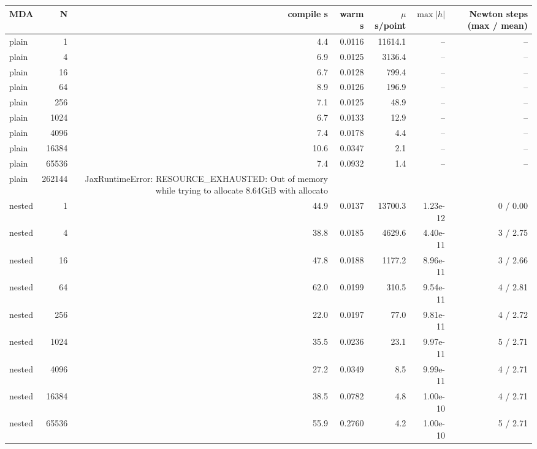 \begin{tabular}{lrrrrrr}
\toprule
MDA & N & compile s & warm s & $\mu$s/point & $\max|h|$ & Newton steps (max / mean) \\
\midrule
plain & 1 & 4.4 & 0.0116 & 11614.1 & -- & -- \\
plain & 4 & 6.9 & 0.0125 & 3136.4 & -- & -- \\
plain & 16 & 6.7 & 0.0128 & 799.4 & -- & -- \\
plain & 64 & 8.9 & 0.0126 & 196.9 & -- & -- \\
plain & 256 & 7.1 & 0.0125 & 48.9 & -- & -- \\
plain & 1024 & 6.7 & 0.0133 & 12.9 & -- & -- \\
plain & 4096 & 7.4 & 0.0178 & 4.4 & -- & -- \\
plain & 16384 & 10.6 & 0.0347 & 2.1 & -- & -- \\
plain & 65536 & 7.4 & 0.0932 & 1.4 & -- & -- \\
plain & 262144 & JaxRuntimeError: RESOURCE_EXHAUSTED: Out of memory while trying to allocate 8.64GiB with allocato &  &  &  &  \\
nested & 1 & 44.9 & 0.0137 & 13700.3 & 1.23e-12 & 0 / 0.00 \\
nested & 4 & 38.8 & 0.0185 & 4629.6 & 4.40e-11 & 3 / 2.75 \\
nested & 16 & 47.8 & 0.0188 & 1177.2 & 8.96e-11 & 3 / 2.66 \\
nested & 64 & 62.0 & 0.0199 & 310.5 & 9.54e-11 & 4 / 2.81 \\
nested & 256 & 22.0 & 0.0197 & 77.0 & 9.81e-11 & 4 / 2.72 \\
nested & 1024 & 35.5 & 0.0236 & 23.1 & 9.97e-11 & 5 / 2.71 \\
nested & 4096 & 27.2 & 0.0349 & 8.5 & 9.99e-11 & 4 / 2.71 \\
nested & 16384 & 38.5 & 0.0782 & 4.8 & 1.00e-10 & 4 / 2.71 \\
nested & 65536 & 55.9 & 0.2760 & 4.2 & 1.00e-10 & 5 / 2.71 \\

\end{tabular}
